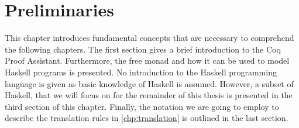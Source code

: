 \chapter{Preliminaries} \label{chp:preliminaries}
This chapter introduces fundamental concepts that are necessary to comprehend the following chapters.
The first section gives a brief introduction to the Coq Proof Assistant.
Furthermore, the free monad and how it can be used to model Haskell programs is presented.
No introduction to the Haskell programming language is given as basic knowledge of Haskell is assumed.
However, a subset of Haskell, that we will focus on for the remainder of this thesis is presented in the third section of this chapter.
Finally, the notation we are going to employ to describe the translation rules in \autoref{chp:translation} is outlined in the last section.





